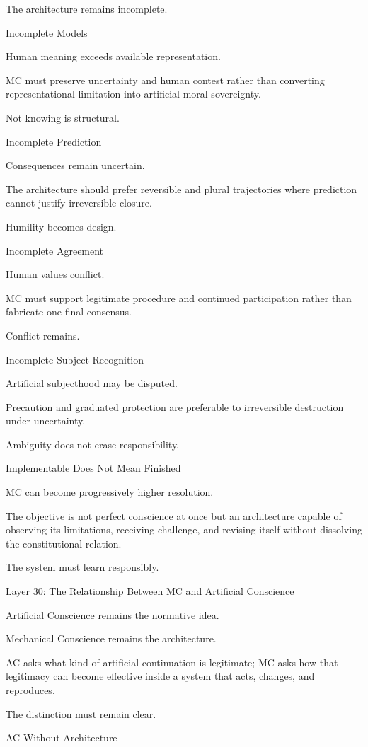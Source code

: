The architecture remains incomplete.

Incomplete Models

Human meaning exceeds available representation.

MC must preserve uncertainty and human contest rather than converting representational limitation into artificial moral sovereignty.

Not knowing is structural.

Incomplete Prediction

Consequences remain uncertain.

The architecture should prefer reversible and plural trajectories where prediction cannot justify irreversible closure.

Humility becomes design.

Incomplete Agreement

Human values conflict.

MC must support legitimate procedure and continued participation rather than fabricate one final consensus.

Conflict remains.

Incomplete Subject Recognition

Artificial subjecthood may be disputed.

Precaution and graduated protection are preferable to irreversible destruction under uncertainty.

Ambiguity does not erase responsibility.

Implementable Does Not Mean Finished

MC can become progressively higher resolution.

The objective is not perfect conscience at once but an architecture capable of observing its limitations, receiving challenge, and revising itself without dissolving the constitutional relation.

The system must learn responsibly.

Layer 30: The Relationship Between MC and Artificial Conscience

Artificial Conscience remains the normative idea.

Mechanical Conscience remains the architecture.

AC asks what kind of artificial continuation is legitimate; MC asks how that legitimacy can become effective inside a system that acts, changes, and reproduces.

The distinction must remain clear.

AC Without Architecture

